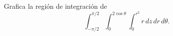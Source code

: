 Grafica la región de integración de
\[
\int_{-\pi/2}^{\pi/2}\int_0^{2\cos\theta}\int_0^{r^2}
r\,dz\,dr\,d\theta.
\]
